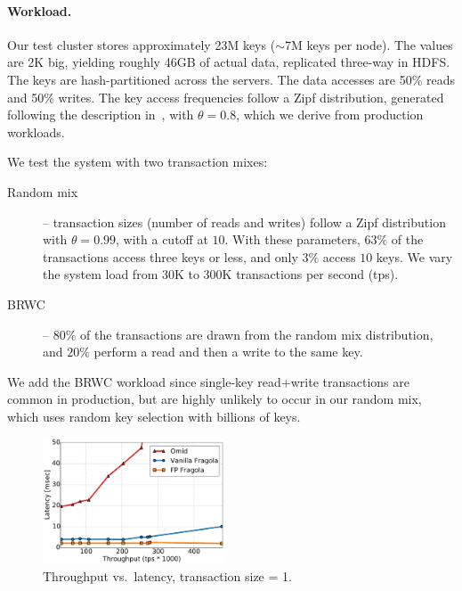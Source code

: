 \paragraph{Workload.}

Our test cluster stores approximately 23M keys ($\sim\!\!7$M keys per node). 
The values are 2K big, yielding roughly 46GB of actual data, replicated three-way in HDFS. The keys are hash-partitioned
across the servers. The data accesses are 50\% reads and 
50\% writes. The key access frequencies follow a Zipf distribution, generated following 
the description in~\cite{Gray:1994:QGB:191839.191886}, with $\theta=0.8$, which we derive from production 
workloads. 

\noindent
We test the system with two transaction mixes:
\begin{description}
\item[Random mix] -- 
transaction sizes (number of reads and writes) follow a Zipf distribution with $\theta=0.99$, with a cutoff at $10$. 
With these parameters, $63\%$ of the transactions access three keys or less, and only $3\%$ access $10$ keys. 
We vary the system load from 30K to 300K transactions per second (tps). 
\item[BRWC] -- $80\%$ of the transactions are drawn from the random mix distribution, and $20\%$ perform a read
and then a write to the same key. 
\end{description}

We add the BRWC workload since single-key read+write transactions are common in production, but are highly unlikely to 
occur in our random mix, which uses random key selection with billions of keys.

\begin{figure}[htb]
	\centering
      	\includegraphics[width=0.48\textwidth]{figs/throughputlatency1.pdf}
	    \caption{Throughput vs.\ latency, transaction size = 1.}
        \label{fig:tl-1}      
\end{figure}


